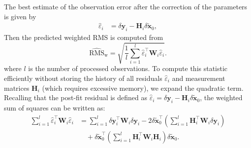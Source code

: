 \documentclass[pdflatex,sn-mathphys-num]{sn-jnl}%
\theoremstyle{thmstyleone}%
\theoremstyle{thmstyletwo}%
\theoremstyle{thmstylethree}%
\renewcommand{\vec}[1]{\boldsymbol{#1}}
\begin{document}
\begin{appendices}
The best estimate of the observation error after the correction of the parameters is given by
\begin{align}
	\hat{\varepsilon}_i &= \delta\vec{y}_i - \vec{H}_i \delta\tilde{\vec{x}}_0, \label{eq:22.73}
\end{align}
%
Then the predicted weighted RMS is computed from
\begin{equation}
	\widehat{\mathrm{RMS}}_{\mathrm{w}} = \sqrt{\frac{1}{l}\displaystyle\sum_{i=1}^{l} \hat{\varepsilon}_i^\top 
	\vec{W}_i%
	\hat{\varepsilon}_i}. \label{eq:rms_def} %
\end{equation}
%
where $l$ is the number of processed observations. To compute this statistic efficiently without storing the history of all residuals $\hat{\varepsilon}_i$ and measurement matrices $\vec{H}_i$ (which requires excessive memory), we expand the quadratic term. Recalling that the post-fit residual is defined as $\hat{\varepsilon}_i = \delta\vec{y}_i - \vec{H}_i \delta\tilde{\vec{x}}_0$, the weighted sum of squares can be written as:
\begin{align}
	\displaystyle\sum_{i=1}^{l} \hat{\varepsilon}_i^\top 
	\vec{W}_i
	\hat{\varepsilon}_i 
	&= \sum_{i=1}^{l} \delta\vec{y}_i^\top \vec{W}_i \delta\vec{y}_i
	- 2 \delta\tilde{\vec{x}}_0^\top \left( \sum_{i=1}^{l} \vec{H}_i^\top \vec{W}_i \delta\vec{y}_i \right) 
	\nonumber \\ 
	& \quad +
	\delta\tilde{\vec{x}}_0^\top \left( \sum_{i=1}^{l} \vec{H}_i^\top \vec{W}_i \vec{H}_i \right) \delta\tilde{\vec{x}}_0.
\end{align}

\end{appendices}
\end{document}
